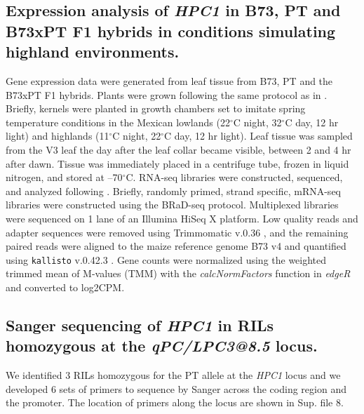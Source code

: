 \documentclass[9pt,twocolumn,twoside,lineno]{biorxiv}
\newcommand{\hpc}{\textit{HPC1}\xspace}
\begin{document}
\subsection{Expression analysis of \hpc in B73, PT and B73xPT F1 hybrids in conditions simulating highland environments.}
Gene expression data were generated from leaf tissue from B73, PT and the B73xPT F1 hybrids. 
Plants were grown following the same protocol as in \cite{Crow2020-gene}.
Briefly, kernels were planted in growth chambers set to imitate spring temperature conditions in the Mexican lowlands (22$^{\circ}$C night, 32$^{\circ}$C day, 12 hr light) and highlands (11$^{\circ}$C night, 22$^{\circ}$C day, 12 hr light). 
Leaf tissue was sampled from the V3 leaf the day after the leaf collar became visible, between 2 and 4 hr after dawn. 
Tissue was immediately placed in a centrifuge tube, frozen in liquid nitrogen, and stored at --70$^{\circ}$C.
RNA-seq libraries were constructed, sequenced, and analyzed following \cite{Crow2020-gene}. 
Briefly, randomly primed, strand specific, mRNA-seq libraries were constructed using the BRaD-seq \cite{townsley2015brad} protocol.
Multiplexed libraries were sequenced on 1 lane of an Illumina HiSeq X platform. 
Low quality reads and adapter sequences were removed using Trimmomatic v.0.36 \cite{bolger2014trimmomatic}, and the remaining paired reads were aligned to the maize reference genome B73 v4 and quantified using \texttt{kallisto} v.0.42.3 \cite{bray2016near}. 
Gene counts were normalized using the weighted trimmed mean of M-values (TMM) with the \textit{calcNormFactors} function in \textit{edgeR} \cite{robinson2010edger} and converted to log2CPM.
\subsection{Sanger sequencing of \hpc in RILs homozygous at the \textit{qPC/LPC3@8.5} locus.}
We identified 3 RILs homozygous for the PT allele at the \hpc locus and we developed 6 sets of primers to sequence by Sanger across the coding region and the promoter. 
The location of primers along the locus are shown in Sup. file 8. 
\end{document}
